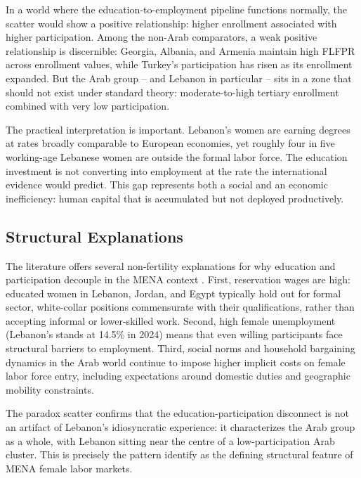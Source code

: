 \documentclass[12pt,a4paper]{article}
\begin{document}
In a world where the education-to-employment pipeline functions normally, the scatter would show a positive relationship: higher enrollment associated with higher participation. Among the non-Arab comparators, a weak positive relationship is discernible: Georgia, Albania, and Armenia maintain high FLFPR across enrollment values, while Turkey's participation has risen as its enrollment expanded. But the Arab group -- and Lebanon in particular -- sits in a zone that should not exist under standard theory: moderate-to-high tertiary enrollment combined with very low participation.

The practical interpretation is important. Lebanon's women are earning degrees at rates broadly comparable to European economies, yet roughly four in five working-age Lebanese women are outside the formal labor force. The education investment is not converting into employment at the rate the international evidence would predict. This gap represents both a social and an economic inefficiency: human capital that is accumulated but not deployed productively.

\subsection{Structural Explanations}

The literature offers several non-fertility explanations for why education and participation decouple in the MENA context \citep{assaad2020, majbouri2020}. First, reservation wages are high: educated women in Lebanon, Jordan, and Egypt typically hold out for formal sector, white-collar positions commensurate with their qualifications, rather than accepting informal or lower-skilled work. Second, high female unemployment (Lebanon's stands at 14.5\% in 2024) means that even willing participants face structural barriers to employment. Third, social norms and household bargaining dynamics in the Arab world continue to impose higher implicit costs on female labor force entry, including expectations around domestic duties and geographic mobility constraints.

The paradox scatter confirms that the education-participation disconnect is not an artifact of Lebanon's idiosyncratic experience: it characterizes the Arab group as a whole, with Lebanon sitting near the centre of a low-participation Arab cluster. This is precisely the pattern \citet{assaad2020} identify as the defining structural feature of MENA female labor markets.

\end{document}
